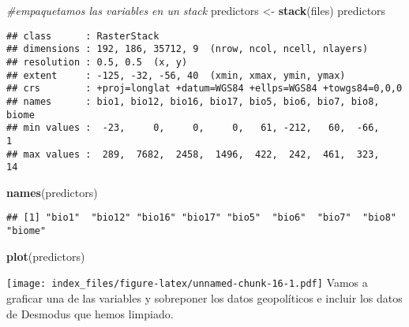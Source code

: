 \documentclass[]{article}
\newenvironment{Shaded}{\begin{snugshade}}{\end{snugshade}}
\newcommand{\KeywordTok}[1]{\textcolor[rgb]{0.13,0.29,0.53}{\textbf{{#1}}}}
\newcommand{\StringTok}[1]{\textcolor[rgb]{0.31,0.60,0.02}{{#1}}}
\newcommand{\CommentTok}[1]{\textcolor[rgb]{0.56,0.35,0.01}{\textit{{#1}}}}
\newcommand{\NormalTok}[1]{{#1}}
\begin{document}
\begin{Shaded}
\begin{Highlighting}[]
\CommentTok{#empaquetamos las variables en un stack}
\NormalTok{predictors <-}\StringTok{ }\KeywordTok{stack}\NormalTok{(files)}
\NormalTok{predictors}
\end{Highlighting}
\end{Shaded}

\begin{verbatim}
## class      : RasterStack 
## dimensions : 192, 186, 35712, 9  (nrow, ncol, ncell, nlayers)
## resolution : 0.5, 0.5  (x, y)
## extent     : -125, -32, -56, 40  (xmin, xmax, ymin, ymax)
## crs        : +proj=longlat +datum=WGS84 +ellps=WGS84 +towgs84=0,0,0 
## names      : bio1, bio12, bio16, bio17, bio5, bio6, bio7, bio8, biome 
## min values :  -23,     0,     0,     0,   61, -212,   60,  -66,     1 
## max values :  289,  7682,  2458,  1496,  422,  242,  461,  323,    14
\end{verbatim}

\begin{Shaded}
\begin{Highlighting}[]
\KeywordTok{names}\NormalTok{(predictors)}
\end{Highlighting}
\end{Shaded}

\begin{verbatim}
## [1] "bio1"  "bio12" "bio16" "bio17" "bio5"  "bio6"  "bio7"  "bio8"  "biome"
\end{verbatim}

\begin{Shaded}
\begin{Highlighting}[]
\KeywordTok{plot}\NormalTok{(predictors)}
\end{Highlighting}
\end{Shaded}

\texttt{[image: index\_files/figure-latex/unnamed-chunk-16-1.pdf]} Vamos
a graficar una de las variables y sobreponer los datos geopolíticos e
incluir los datos de Desmodus que hemos limpiado.
\end{document}
